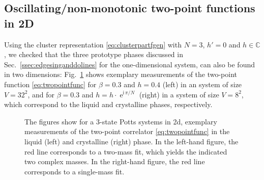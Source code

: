 \documentclass[epj]{webofc}
\newcommand{\e}{\operatorname{e}}
\newcommand{\ii}{\mathrm{i}}
\renewcommand*\[{\begin{equation}}
\renewcommand*\]{\end{equation}}
\begin{document}
\subsection{Oscillating/non-monotonic two-point functions in 2D}\label{ssec:oscillatingtwopointfunc}
Using the cluster representation \eqref{eq:clusterpartfgen} with $N=3$, $h'=0$ and $h\in\mathbb{C}$, we checked that the three prototype phases discussed in Sec.~\ref{ssec:edgesinganddolines} for the one-dimensional system, can also be found in two dimensions: Fig.~\ref{fig:twopointcorr2d} shows exemplary measurements of the two-point function \eqref{eq:twopointfunc} for $\beta=0.3$ and $h=0.4$ (left) in an system of size $V=32^2$, and for $\beta=0.3$ and $h=h\cdot\e^{\ii\,\pi/N}$ (right) in a system of size $V=8^2$, which correspond to the liquid and crystalline phases, respectively.

\begin{figure}[h]
\centering
\begin{minipage}[t]{0.45\linewidth}
\centering
{}
\end{minipage}\hfill
\begin{minipage}[t]{0.45\linewidth}
\centering
{}
\end{minipage}
\caption{The figures show for a $3$-state Potts systems in 2d, exemplary measurements of the two-point correlator \eqref{eq:twopointfunc} in the liquid (left) and crystalline (right) phase. In the left-hand figure, the red line corresponds to a two-mass fit, which yields the indicated two complex masses. In the right-hand figure, the red line corresponds to a single-mass fit.}
\label{fig:twopointcorr2d}
\end{figure}
\end{document}
